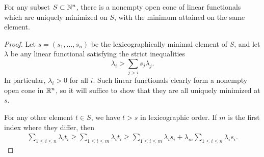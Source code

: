 \documentclass{amsart}
\begin{document}
\begin{lemma}
  For any subset $S \subset \mathbb{N}^n$, there is a nonempty open cone of linear functionals which are uniquely minimized on $S$, with the minimum attained on the same element.
\end{lemma}
\begin{proof}
  Let $s = (s_1,\dots,s_n)$ be the lexicographically minimal element of $S$, and let $\lambda$ be any linear functional satisfying the strict inequalities
  \[
    \lambda_i > \sum_{j>i} s_j\lambda_j.
  \]
  In particular, $\lambda_i>0$ for all $i$. Such linear functionals clearly form a nonempty open cone in $\mathbb{R}^n$, so it will suffice to show that they are all uniquely minimized at $s$.

  For any other element $t \in S$, we have $t > s$ in lexicographic order. If $m$ is the first index where they differ, then
  \begin{align*}
    \sum_{1\le i\le n} \lambda_i t_i
    \ge
    \sum_{1\le i\le m} \lambda_i t_i
    \ge
    \sum_{1\le i\le m} \lambda_i s_i
    +
    \lambda_m
    \sum_{1\le i\le n} \lambda_i s_i.
  \end{align*}
\end{proof}
%
%
%
%
%
%
\end{document}
